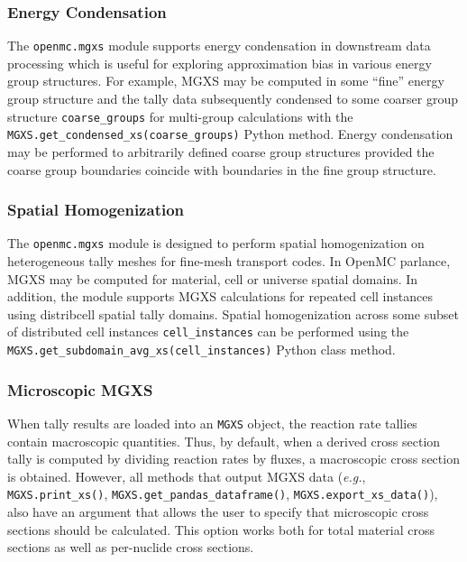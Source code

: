 \subsubsection{Energy Condensation}
\label{subsec:energy-condense}

The \texttt{openmc.mgxs} module supports energy condensation in downstream data processing which is useful for exploring approximation bias in various energy group structures. For example, MGXS may be computed in some ``fine'' energy group structure and the tally data subsequently condensed to some coarser group structure \texttt{coarse_groups} for multi-group calculations with the \texttt{MGXS.get_condensed_xs(coarse_groups)} Python method. Energy condensation may be performed to arbitrarily defined coarse group structures provided the coarse group boundaries coincide with boundaries in the fine group structure.


\subsubsection{Spatial Homogenization}
\label{subsec:pinwise-homogenize}

The \texttt{openmc.mgxs} module is designed to perform spatial homogenization on heterogeneous tally meshes for fine-mesh transport codes. In OpenMC parlance, MGXS may be computed for material, cell or universe spatial domains. In addition, the module supports MGXS calculations for repeated cell instances using distribcell spatial tally domains\cite{lax2014distribcell}. Spatial homogenization across some subset of distributed cell instances \texttt{cell_instances} can be performed using the \texttt{MGXS.get_subdomain_avg_xs(cell_instances)} Python class method.



\subsubsection{Microscopic MGXS}
\label{subsec:micro-macro}

When tally results are loaded into an \texttt{MGXS} object, the reaction rate tallies contain macroscopic quantities. Thus, by default, when a derived cross section tally is computed by dividing reaction rates by fluxes, a macroscopic cross section is obtained. However, all methods that output MGXS data (\textit{e.g.}, \texttt{MGXS.print_xs()}, \texttt{MGXS.get_pandas_dataframe()}, \texttt{MGXS.export_xs_data()}), also have an argument that allows the user to specify that microscopic cross sections should be calculated. This option works both for total material cross sections as well as per-nuclide cross sections.


